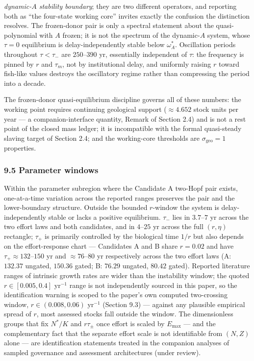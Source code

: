 \documentclass[11pt]{article}
\begin{document}
\emph{dynamic-\(A\) stability boundary}; they are two different
operators, and reporting both as ``the four-state working core'' invites
exactly the confusion the distinction resolves. The frozen-donor pair is
only a spectral statement about the quasi-polynomial with \(A\) frozen;
it is not the spectrum of the dynamic-\(A\) system, whose \(\tau = 0\)
equilibrium is delay-independently stable below \(\omega_A^*\).
Oscillation periods throughout \(\tau < \tau_-\) are \(250\)--\(390\)
yr, essentially independent of \(\tau\): the frequency is pinned by
\(r\) and \(\tau_m\), not by institutional delay, and uniformly raising
\(r\) toward fish-like values destroys the oscillatory regime rather
than compressing the period into a decade.

The frozen-donor quasi-equilibrium discipline governs all of these
numbers: the working point requires continuing geological support
(\(\approx4.652\) stock units per year --- a companion-interface
quantity, Remark of Section 2.4) and is not a rest point of the closed
mass ledger; it is incompatible with the formal quasi-steady slaving
target of Section 2.4; and the working-core thresholds are
\(\sigma_{\mathrm{geo}} = 1\) properties.

\subsubsection{9.5 Parameter windows}\label{parameter-windows}

Within the parameter subregion where the Candidate A two-Hopf pair
exists, one-at-a-time variation across the reported ranges preserves the
pair and the lower-boundary structure. Outside the bounded \(r\)-window
the system is delay-independently stable or lacks a positive
equilibrium. \(\tau_-\) lies in \(3.7\)--\(7\) yr across the two effort
laws and both candidates, and in \(4\)--\(25\) yr across the full
\((r, \eta)\) rectangle; \(\tau_+\) is primarily controlled by the
biological time \(1/r\) but also depends on the effort-response chart
--- Candidates A and B share \(r = 0.02\) and have
\(\tau_+ \approx 132\)--\(150\) yr and \(\approx76\)--\(80\) yr
respectively across the two effort laws (A: \(132.37\) ungated,
\(150.36\) gated; B: \(76.29\) ungated, \(80.42\) gated). Reported
literature ranges of intrinsic growth rates are wider than the
instability window; the quoted \(r \in [0.005, 0.4]\) yr\(^{-1}\) range
is not independently sourced in this paper, so the identification
warning is scoped to the paper's own computed two-crossing window,
\(r \in (0.008, 0.06)\) yr\(^{-1}\) (Section 9.3) --- against any
plausible empirical spread of \(r\), most assessed stocks fall outside
the window. The dimensionless groups that fix \(N^*/K\) and
\(r\tau_\pm\) once effort is scaled by \(E_{\max}\) --- and the
complementary fact that the separate effort scale is not identifiable
from \((N, Z)\) alone --- are identification statements treated in the
companion analyses of sampled governance and assessment architectures
(under review).
\end{document}

